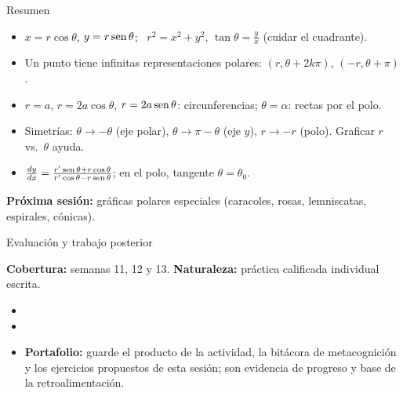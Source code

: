 \documentclass[10pt,aspectratio=169]{beamer}
\begin{document}
\begin{frame}{Resumen}
  \begin{itemize}
    \item $x=r\cos\theta$, $y=r\operatorname{sen}\theta$; \ $r^2=x^2+y^2$, $\tan\theta=\frac yx$ (cuidar el cuadrante).
    \item Un punto tiene infinitas representaciones polares: $(r,\theta+2k\pi)$, $(-r,\theta+\pi)$.
    \item $r=a$, $r=2a\cos\theta$, $r=2a\operatorname{sen}\theta$: circunferencias; $\theta=\alpha$: rectas por el polo.
    \item Simetrías: $\theta\to-\theta$ (eje polar), $\theta\to\pi-\theta$ (eje $y$), $r\to-r$ (polo). Graficar $r$ vs.\ $\theta$ ayuda.
    \item $\frac{dy}{dx}=\frac{r'\operatorname{sen}\theta+r\cos\theta}{r'\cos\theta-r\operatorname{sen}\theta}$; en el polo, tangente $\theta=\theta_0$.
  \end{itemize}
  \vspace{3mm}
  \textbf{Próxima sesión:} gráficas polares especiales (caracoles, rosas, lemniscatas, espirales, cónicas).
\end{frame}


\begin{frame}{Evaluación y trabajo posterior}
  \small
  \begin{evalbox}
    \textbf{Cobertura:} semanas 11, 12 y 13. \textbf{Naturaleza:} práctica calificada individual escrita.
  \end{evalbox}
  \begin{itemize}
    \item \criterios
    \item \declaracionia
    \item \textbf{Portafolio:} guarde el producto de la actividad, la bitácora de metacognición y los ejercicios propuestos de esta sesión; son evidencia de progreso y base de la retroalimentación.
  \end{itemize}
\end{frame}
\end{document}
